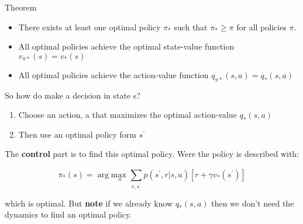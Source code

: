 \begin{wbox}{Theorem}
\begin{itemize}
	\item There exists at least one optimal policy $\pi_*$ such that $\pi_* \ge \pi$ for all policies $\pi$.
	\item All optimal policies achieve the optimal state-value function $v_{\pi *}(s) = v_*(s)$ 
	\item All optimal policies achieve the action-value function $q_{\pi *} (s,a) = q_* (s,a)$
\end{itemize}
\end{wbox}


So how do make a decision in state s?

\begin{enumerate}
	\item Choose an action, a that maximizes the optimal action-value $q_*(s,a)$
	\item Then use an optimal policy form $s^{\prime}$
\end{enumerate}

The \textbf{control} part is to find this optimal policy. Were the policy is described with:

	\begin{equation}
		\pi_* (s) = \arg \underset{a}{\text{max }} \sum_{r, s^{\prime}}^{} p(s^{\prime},r |s,a) [r + \gamma v_*(s^{\prime})] 
	\end{equation}

which is optimal. But \textbf{note} if we already know $q_*(s,a)$ then we don't need the dynamics to find an optimal policy. 








